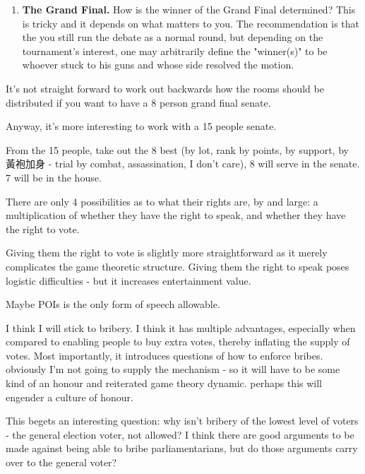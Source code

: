 \begin{enumerate}
    \item \textbf{The Grand Final.} How is the winner of the Grand Final determined? This is tricky and it depends on what matters to you. The recommendation is that the you still run the debate as a normal round, but depending on the tournament's interest, one may arbitrarily define the "winner(s)" to be whoever stuck to his guns and whose side resolved the motion. 







    
\end{enumerate}






It's not straight forward to work out backwards how the rooms should be distributed if you want to have a 8 person grand final senate.

Anyway, it's more interesting to work with a 15 people senate.

From the 15 people, take out the 8 best (by lot, rank by points, by support, by 黃袍加身 - trial by combat, assassination, I don't care), 8 will serve in the senate. 7 will be in the house.

There are only 4 possibilities as to what their rights are, by and large: a multiplication of whether they have the right to speak, and whether they have the right to vote.

Giving them the right to vote is slightly more straightforward as it merely complicates the game theoretic structure. Giving them the right to speak poses logistic difficulties - but it increases entertainment value.

Maybe POIs is the only form of speech allowable.

I think I will stick to bribery. I think it has multiple advantages, especially when compared to enabling people to buy extra votes, thereby inflating the supply of votes. Most importantly, it introduces questions of how to enforce bribes. obviously I'm not going to supply the mechanism - so it will have to be some kind of an honour and reiterated game theory dynamic. perhaps this will engender a culture of honour.

This begets an interesting question: why isn't bribery of the lowest level of voters - the general election voter, not allowed? I think there are good arguments to be made against being able to bribe parliamentarians, but do those arguments carry over to the general voter?

